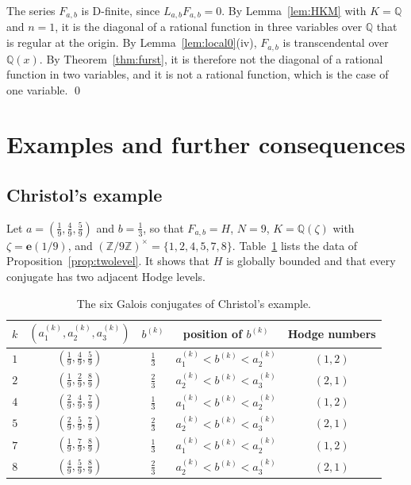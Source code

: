 \documentclass[11pt]{amsart}
\theoremstyle{definition}
\theoremstyle{remark}
\numberwithin{equation}{section}
\newcommand{\Q}{\mathbb{Q}}
\newcommand{\Z}{\mathbb{Z}}
\newcommand{\e}{\mathbf{e}}
\newcommand{\ak}[1]{a^{(k)}_{#1}}
\newcommand{\bk}{b^{(k)}}
\newcommand{\Fab}{F_{a,b}}
\begin{document}
The series $\Fab$ is D-finite, since $L_{a,b}\Fab=0$. By Lemma~\ref{lem:HKM} with $K=\Q$ and $n=1$, it is the diagonal of a rational function in three variables over $\Q$ that is regular at the origin. By Lemma~\ref{lem:local0}(iv), $\Fab$ is transcendental over $\Q(x)$. By Theorem~\ref{thm:furst}, it is therefore not the diagonal of a rational function in two variables, and it is not a rational function, which is the case of one variable. \qed

\section{Examples and further consequences}\label{sec:examples}

\subsection{Christol's example}\label{subsec:H}
Let $a=(\frac19,\frac49,\frac59)$ and $b=\frac13$, so that $\Fab=H$, $N=9$, $K=\Q(\zeta)$ with $\zeta=\e(1/9)$, and $(\Z/9\Z)^\times=\{1,2,4,5,7,8\}$. Table~\ref{tab:H} lists the data of Proposition~\ref{prop:twolevel}. It shows that $H$ is globally bounded and that every conjugate has two adjacent Hodge levels.

\begin{table}[ht]
\centering
\renewcommand{\arraystretch}{1.25}
\begin{tabular}{ccccc}
\toprule
$k$ & $(\ak1,\ak2,\ak3)$ & $\bk$ & position of $\bk$ & Hodge numbers\\
\midrule
$1$ & $(\frac19,\frac49,\frac59)$ & $\frac13$ & $\ak1<\bk<\ak2$ & $(1,2)$\\
$2$ & $(\frac19,\frac29,\frac89)$ & $\frac23$ & $\ak2<\bk<\ak3$ & $(2,1)$\\
$4$ & $(\frac29,\frac49,\frac79)$ & $\frac13$ & $\ak1<\bk<\ak2$ & $(1,2)$\\
$5$ & $(\frac29,\frac59,\frac79)$ & $\frac23$ & $\ak2<\bk<\ak3$ & $(2,1)$\\
$7$ & $(\frac19,\frac79,\frac89)$ & $\frac13$ & $\ak1<\bk<\ak2$ & $(1,2)$\\
$8$ & $(\frac49,\frac59,\frac89)$ & $\frac23$ & $\ak2<\bk<\ak3$ & $(2,1)$\\
\bottomrule
\end{tabular}
\medskip
\caption{The six Galois conjugates of Christol's example.}\label{tab:H}
\end{table}
\end{document}
